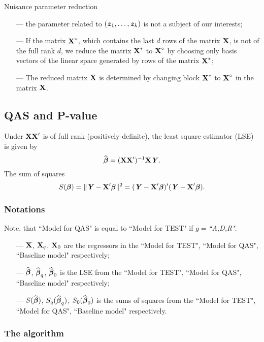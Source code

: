 \documentclass[11pt]{article}
\begin{document}
Nuisance parameter reduction\vspace{-2mm}
\begin{itemize}
\setlength\itemsep{-0.3em}
\item[---]
the parameter related to $(\mbox{\textbf{\textit z}}_1,\ldots,\mbox{\textbf{\textit z}}_k)$ is not a subject of our interests;
\item[---]
If the matrix $\mbox{\bf X}^*$, which contains the last $d$ rows of the matrix $\mbox{\bf X}$, is not of the full rank $d$, we reduce the matrix $\mbox{\bf X}^*$ to $\mbox{\bf X}^{\circ}$ by choosing only basis vectors of the linear space generated by rows of the matrix $\mbox{\bf X}^*$;
\item[---]
The reduced matrix $\mbox{\bf X}$ is determined by changing block $\mbox{\bf X}^*$ to $\mbox{\bf X}^{\circ}$ in the matrix $\mbox{\bf X}$.
\end{itemize}

\subsection*{QAS and P-value}

\noindent Under $\mbox{\bf X}\mbox{\bf X}'$ is of full rank (positively definite), the least square estimator (LSE) is given by 
$$
\widehat{{\boldsymbol \beta}}=(\mbox{\bf X}\mbox{\bf X}')^{-1}\mbox{\bf X}\mbox{\textbf{\textit Y}}.
$$
The sum of squares
$$
S({\boldsymbol \beta})=\|\mbox{\textbf{\textit Y}}-\mbox{\bf X}'{\boldsymbol \beta}\|^2=(\mbox{\textbf{\textit Y}}-\mbox{\bf X}'{\boldsymbol \beta})'(\mbox{\textbf{\textit Y}}-\mbox{\bf X}'{\boldsymbol \beta}).
$$
\subsubsection*{Notations} 
\noindent Note, that ``Model for QAS" is equal to ``Model for TEST" if $g=${\it ``A,D,R"}. 
\vspace{-2mm}
\begin{itemize}
\setlength\itemsep{-0.3em}
\item[---]
$\mbox{\bf X}$, $\mbox{\bf X}_q$, $\mbox{\bf X}_0$ are the regressors in the ``Model for TEST", ``Model for QAS", ``Baseline model" respectively;
\item[---]
$\widehat{{\boldsymbol \beta}}$, $\widehat{{\boldsymbol \beta}}_q$, $\widehat{{\boldsymbol \beta}}_0$ is the LSE from the ``Model for TEST", ``Model for QAS", ``Baseline model" respectively;
\item[---]
$S(\widehat{{\boldsymbol \beta}})$, $S_q(\widehat{{\boldsymbol \beta}}_q)$, $S_0(\widehat{{\boldsymbol \beta}}_0)$ is the sums of squares from the ``Model for TEST", ``Model for QAS", ``Baseline model" respectively.
\end{itemize}
\subsubsection*{The algorithm}
\end{document}
